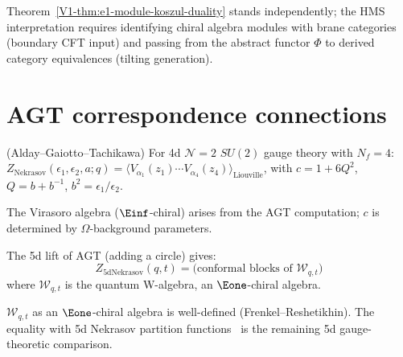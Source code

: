\begin{remark}
Theorem~\ref*{V1-thm:e1-module-koszul-duality} stands independently; the HMS interpretation requires identifying chiral algebra modules with brane categories (boundary CFT input) and passing from the abstract functor $\Phi$ to derived category equivalences (tilting generation).
\end{remark}


\section{AGT correspondence connections}

\begin{theorem}
(Alday--Gaiotto--Tachikawa) For 4d $\mathcal{N}=2$ $SU(2)$ gauge theory with $N_f=4$: $Z_{\mathrm{Nekrasov}}(\epsilon_1,\epsilon_2,a;q) = \langle V_{\alpha_1}(z_1)\cdots V_{\alpha_4}(z_4)\rangle_{\mathrm{Liouville}}$, with $c = 1+6Q^2$, $Q=b+b^{-1}$, $b^2=\epsilon_1/\epsilon_2$.
\end{theorem}

\begin{corollary}
The Virasoro algebra ($\Einf$-chiral) arises from the AGT computation; $c$ is determined by $\Omega$-background parameters.
\end{corollary}


\begin{remark}
The 5d lift of AGT (adding a circle) gives:
\[
Z_{\mathrm{5d Nekrasov}}(q, t) = \text{(conformal blocks of } \mathcal{W}_{q,t})
\]
where $\mathcal{W}_{q,t}$ is the quantum W-algebra, an $\Eone$-chiral algebra.
\end{remark}

\begin{remark}
$\mathcal{W}_{q,t}$ as an $\Eone$-chiral algebra is well-defined
(Frenkel--Reshetikhin). The equality with 5d Nekrasov partition
functions~\cite{AY10} is the remaining 5d gauge-theoretic comparison.
\end{remark}
